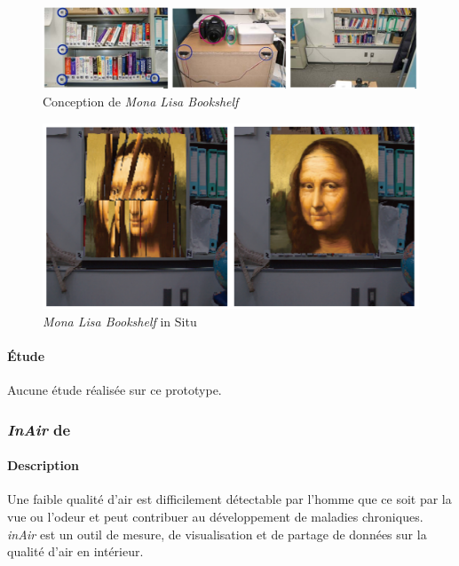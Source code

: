 \documentclass[10pt,a5paper,twoside]{article}
\begin{document}
\begin{figure}
\centering
\includegraphics[width=0.900\hsize]{images/monalisa-screenshot2.png}
\caption{Conception de \emph{Mona Lisa Bookshelf}}\label{fig:monalisa2}
\end{figure}

\begin{figure}
\centering
\includegraphics[width=0.900\hsize]{images/monalisa-screenshot3.png}
\caption{\emph{Mona Lisa Bookshelf} in Situ}\label{fig:monalisa3}
\end{figure}

\paragraph{Étude}\label{uxe9tude-1}

Aucune étude réalisée sur ce prototype.

\subsubsection{\emph{InAir} de
\citet{kim2010inair}}\label{inair-de-kim2010inair}

\paragraph{Description}\label{description-2}

Une faible qualité d'air est difficilement détectable par l'homme que ce
soit par la vue ou l'odeur et peut contribuer au développement de
maladies chroniques. \emph{inAir} est un outil de mesure, de
visualisation et de partage de données sur la qualité d'air en
intérieur.
\end{document}
